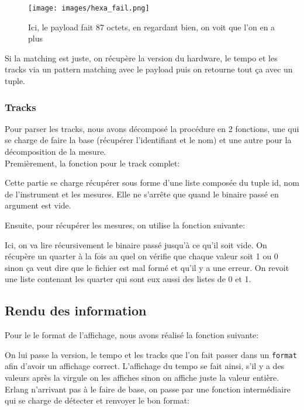 \documentclass[10pt,a4paper]{article}
\begin{document}
\begin{figure}[ht]
	\texttt{[image: images/hexa\_fail.png]}
	\caption{Ici, le payload fait 87 octets, en regardant bien, on voit que l'on en a plus}
\end{figure}

Si la matching est juste, on récupère la version du hardware, le tempo et les tracks via un pattern matching avec le payload puis on retourne tout ça avec un tuple.

\subsubsection{Tracks}
Pour parser les tracks, nous avons décomposé la procédure en 2 fonctions, une qui se charge de faire la base (récupérer l'identifiant et le nom) et une autre pour la décomposition de la mesure.\\

Premièrement, la fonction pour le track complet:



\newpage

Cette partie se charge récupérer sous forme d'une liste composée du tuple id, nom de l'instrument et les mesures. Elle ne s'arrête que quand le binaire passé en argument est vide.

Ensuite, pour récupérer les mesures, on utilise la fonction suivante:



Ici, on va lire récursivement le binaire passé jusqu'à ce qu'il soit vide. On récupère un quarter à la fois au quel on vérifie que chaque valeur soit 1 ou 0 sinon ça veut dire que le fichier est mal formé et qu'il y a une erreur. On revoit une liste contenant les quarter qui sont eux aussi des listes de 0 et 1.

\subsection{Rendu des information}

Pour le le format de l'affichage, nous avons réalisé la fonction suivante:



On lui passe la version, le tempo et les tracks que l'on fait passer dans un \texttt{format} afin d'avoir un affichage correct. L'affichage du tempo se fait ainsi, s'il y a des valeurs après la virgule on les affiches sinon on affiche juste la valeur entière. Erlang n'arrivant pas à le faire de base, on passe par une fonction intermédiaire qui se charge de détecter et renvoyer le bon format:
\end{document}
